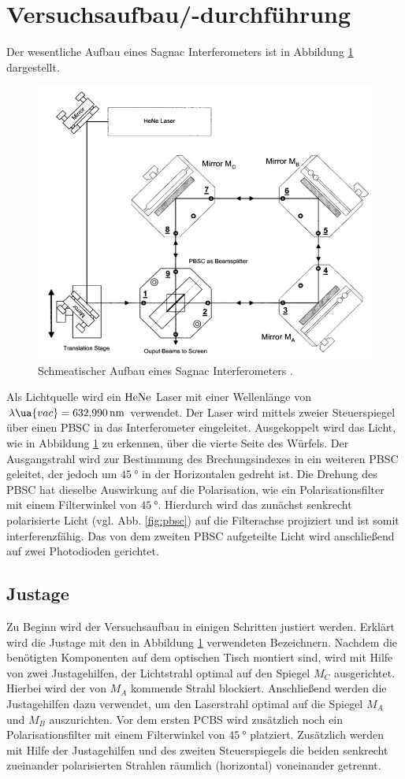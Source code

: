 \section{Versuchsaufbau/-durchführung}
Der wesentliche Aufbau eines Sagnac Interferometers ist in Abbildung \ref{fig:sagnac_interferometer}
dargestellt.
\begin{figure}
\centering
\includegraphics[width=0.6\linewidth]{./content/images/aufbau.png}
\caption{Schmeatischer Aufbau eines Sagnac Interferometers \cite{anleitung64}.}
\label{fig:sagnac_interferometer}
\end{figure}
Als Lichtquelle wird ein $\ce{HeNe}$ Laser mit einer Wellenlänge von
$\lambda\ua{vac}=\SI{632.990}{\nano\meter}$ verwendet. Der Laser wird mittels zweier Steuerspiegel
über einen PBSC in das Interferometer eingeleitet. Ausgekoppelt wird das Licht, wie
in Abbildung \ref{fig:sagnac_interferometer} zu erkennen, über die vierte Seite
des Würfels.
Der Ausgangstrahl wird zur Bestimmung des Brechungsindexes in ein weiteren
PBSC geleitet, der jedoch um $\SI{45}{\degree}$ in der Horizontalen gedreht ist.
Die Drehung des PBSC hat dieselbe Auswirkung auf die Polarisation, wie ein Polarisationsfilter mit
einem Filterwinkel von $\SI{45}{\degree}$. Hierdurch wird das zunächst senkrecht
polarisierte Licht (vgl. Abb. \ref{fig:pbsc}) auf die Filterachse projiziert und
ist somit interferenzfähig. Das von dem zweiten PBSC aufgeteilte Licht wird
anschließend auf zwei Photodioden gerichtet.

\subsection{Justage}
Zu Beginn wird der Versuchsaufbau in einigen Schritten justiert werden.
Erklärt wird die Justage mit den in Abbildung \ref{fig:sagnac_interferometer} verwendeten Bezeichnern.
Nachdem die benötigten Komponenten auf dem optischen Tisch montiert sind,
wird mit Hilfe von zwei Justagehilfen, der Lichtstrahl optimal auf den Spiegel $M_C$
ausgerichtet. Hierbei wird der von $M_A$ kommende Strahl blockiert.
Anschließend werden die Justagehilfen dazu verwendet, um den Laserstrahl optimal auf
die Spiegel $M_A$ und $M_B$ auszurichten. Vor dem ersten PCBS wird zusätzlich noch ein Polarisationsfilter
mit einem Filterwinkel von $\SI{45}{\degree}$ platziert. Zusätzlich werden mit Hilfe der Justagehilfen
und des zweiten Steuerspiegels die beiden senkrecht zueinander polarisierten Strahlen räumlich (horizontal)
voneinander getrennt.

